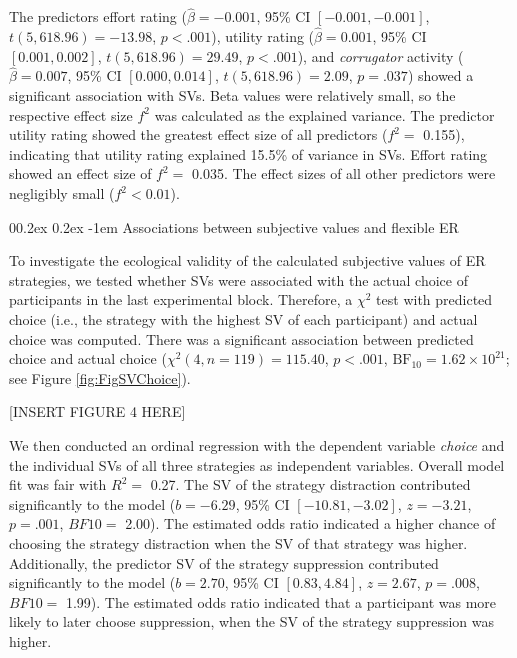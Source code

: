 \documentclass[
  man,floatsintext]{apa6}
\makeatletter
\let\oldparagraph\paragraph
\renewcommand{\paragraph}[1]{\oldparagraph{#1}\mbox{}}
\renewcommand{\paragraph}{\@startsection{paragraph}{4}{\parindent}%
  {0\baselineskip \@plus 0.2ex \@minus 0.2ex}%
  {-1em}%
  {\normalfont\normalsize\bfseries\itshape\typesectitle}}
\makeatother
\begin{document}
The predictors effort rating (\(\hat{\beta} = -0.001\), 95\% CI \([-0.001, -0.001]\), \(t(5,618.96) = -13.98\), \(p < .001\)), utility rating (\(\hat{\beta} = 0.001\), 95\% CI \([0.001, 0.002]\), \(t(5,618.96) = 29.49\), \(p < .001\)), and \emph{corrugator} activity (\(\hat{\beta} = 0.007\), 95\% CI \([0.000, 0.014]\), \(t(5,618.96) = 2.09\), \(p = .037\)) showed a significant association with SVs.
Beta values were relatively small, so the respective effect size \(f^{2}\) was calculated as the explained variance.
The predictor utility rating showed the greatest effect size of all predictors (\(f^{2}=\) 0.155), indicating that utility rating explained 15.5\% of variance in SVs.
Effort rating showed an effect size of \(f^{2}=\) 0.035.
The effect sizes of all other predictors were negligibly small (\(f^{2}< 0.01\)).

\hypertarget{associations-between-subjective-values-and-flexible-er}{%
\paragraph{Associations between subjective values and flexible ER}\label{associations-between-subjective-values-and-flexible-er}}

To investigate the ecological validity of the calculated subjective values of ER strategies, we tested whether SVs were associated with the actual choice of participants in the last experimental block.
Therefore, a \(\chi^{2}\) test with predicted choice (i.e., the strategy with the highest SV of each participant) and actual choice was computed.
There was a significant association between predicted choice and actual choice (\(\chi^2(4, n = 119) = 115.40\), \(p < .001\), \(\mathrm{BF}_{\textrm{10}} = 1.62 \times 10^{21}\); see Figure \ref{fig:FigSVChoice}).

{[}INSERT FIGURE 4 HERE{]}

We then conducted an ordinal regression with the dependent variable \emph{choice} and the individual SVs of all three strategies as independent variables.
Overall model fit was fair with \(R^{2}=\) 0.27.
The SV of the strategy distraction contributed significantly to the model (\(b = -6.29\), 95\% CI \([-10.81, -3.02]\), \(z = -3.21\), \(p = .001\), \(BF10=\) 2.00).
The estimated odds ratio indicated a higher chance of choosing the strategy distraction when the SV of that strategy was higher.
Additionally, the predictor SV of the strategy suppression contributed significantly to the model (\(b = 2.70\), 95\% CI \([0.83, 4.84]\), \(z = 2.67\), \(p = .008\), \(BF10=\) 1.99).
The estimated odds ratio indicated that a participant was more likely to later choose suppression, when the SV of the strategy suppression was higher.
\end{document}

